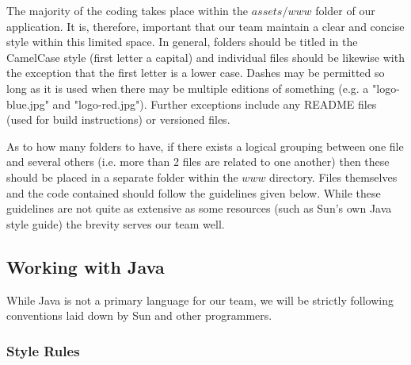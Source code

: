 \documentclass[12pt]{article}
\begin{document}
The majority of the coding takes place within the $assets/www$ folder of our application.  It is, therefore, important that our team maintain a clear and concise style within this limited space.  In general, folders should be titled in the CamelCase style (first letter a capital) and individual files should be likewise with the exception that the first letter is a lower case.  Dashes may be permitted so long as it is used when there may be multiple editions of something (e.g. a "logo-blue.jpg" and "logo-red.jpg").  Further exceptions include any README files (used for build instructions) or versioned files. 



As to how many folders to have, if there exists a logical grouping between one file and several others (i.e. more than 2 files are related to one another) then these should be placed in a separate folder within the $www$ directory.  Files themselves and the code contained should follow the guidelines given below.  While these guidelines are not quite as extensive as some resources (such as Sun's own Java style guide\cite{JavaStyle-Sun}) the brevity serves our team well.



\subsection{Working with Java}

While Java is not a primary language for our team, we will be strictly following conventions laid down by Sun and other programmers\cite{JavaStyle-Sun}\cite{JavaStyle-JavaRanch}.



\subsubsection{Style Rules}
\end{document}
